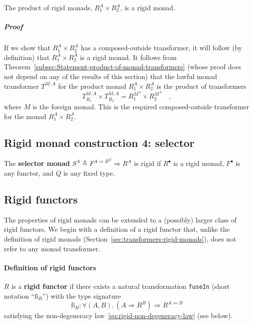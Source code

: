 The product of rigid monads, $R_{1}^{A}\times R_{2}^{A}$, is a rigid
monad.

\subparagraph{Proof}

If we show that $R_{1}^{A}\times R_{2}^{A}$ has a composed-outside
transformer, it will follow (by definition) that $R_{1}^{A}\times R_{2}^{A}$
is a rigid monad. It follows from Theorem~\ref{subsec:Statement-product-of-monad-transformers}
(whose proof does not depend on any of the results of this section)
that the lawful monad transformer $T^{M,A}$ for the product monad
$R_{1}^{A}\times R_{2}^{A}$ is the product of transformers 
\[
T_{R_{1}}^{M,A}\times T_{R_{2}}^{M,A}=R_{1}^{M^{A}}\times R_{2}^{M^{A}}\quad,
\]
where $M$ is the foreign monad. This is the required composed-outside
transformer for the monad $R_{1}^{A}\times R_{2}^{A}$.

\subsection{Rigid monad construction 4: selector}

The \textbf{selector monad} $S^{A}\triangleq F^{A\Rightarrow R^{Q}}\Rightarrow R^{A}$
is rigid if $R^{\bullet}$ is a rigid monad, $F^{\bullet}$ is any
functor, and $Q$ is any fixed type.

\subsection{Rigid functors\label{subsec:Rigid-functors}}

The properties of rigid monads can be extended to a (possibly) larger
class of rigid functors. We begin with a definition of a rigid functor
that, unlike the definition of rigid monads (Section~\ref{sec:transformers-rigid-monads}),
does not refer to any monad transformer.

\paragraph{Definition of rigid functors}

$R$ is a \textbf{rigid functor} if there exists
a natural transformation \lstinline!fuseIn!
(short notation ``$\text{fi}_{R}$'') with the type signature
\[
\text{fi}_{R}:\forall(A,B).\,(A\Rightarrow R^{B})\Rightarrow R^{A\Rightarrow B}
\]
satisfying the non-degeneracy law~\ref{eq:rigid-non-degeneracy-law}
(see below).

